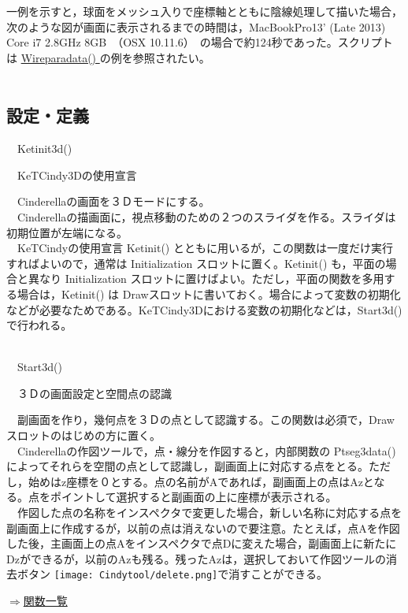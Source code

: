 \documentclass[papersize,a4paper,12pt,uplatex]{jsarticle}
\begin{document}
一例を示すと，球面をメッシュ入りで座標軸とともに陰線処理して描いた場合，次のような図が画面に表示されるまでの時間は，MacBookPro13' (Late 2013) Core i7 2.8GHz 8GB　（OSX 10.11.6）　の場合で約124秒であった。スクリプトは \hyperlink{wireparadata}{Wireparadata() } の例を参照されたい。\\
　　　　　　　　　　　　　

\newpage
\subsection{設定・定義}

\begin{description}

\hypertarget{ketinit3d}{}
\item[関数]　Ketinit3d()
\item[機能]　KeTCindy3Dの使用宣言
\item[説明]　Cinderellaの画面を３Ｄモードにする。\\
　Cinderellaの描画面に，視点移動のための２つのスライダを作る。スライダは初期位置が左端になる。\\
　KeTCindyの使用宣言 Ketinit() とともに用いるが，この関数は一度だけ実行すればよいので，通常は Initialization スロットに置く。Ketinit() も，平面の場合と異なり Initialization スロットに置けばよい。ただし，平面の関数を多用する場合は，Ketinit() は Drawスロットに書いておく。場合によって変数の初期化などが必要なためである。KeTCindy3Dにおける変数の初期化などは，Start3d()で行われる。\\
　\\

\hypertarget{start3d}{}
\item[関数]　Start3d()
\item[機能]　３Ｄの画面設定と空間点の認識
\item[説明]　副画面を作り，幾何点を３Ｄの点として認識する。この関数は必須で，Drawスロットのはじめの方に置く。\\
　Cinderellaの作図ツールで，点・線分を作図すると，内部関数の Ptseg3data() によってそれらを空間の点として認識し，副画面上に対応する点をとる。ただし，始めはz座標を０とする。点の名前がAであれば，副画面上の点はAzとなる。点をポイントして選択すると副画面の上に座標が表示される。\\
　作図した点の名称をインスペクタで変更した場合，新しい名称に対応する点を副画面上に作成するが，以前の点は消えないので要注意。たとえば，点Aを作図した後，主画面上の点Aをインスペクタで点Dに変えた場合，副画面上に新たにDzができるが，以前のAzも残る。残ったAzは，選択しておいて作図ツールの消去ボタン \texttt{[image: Cindytool/delete.png]}で消すことができる。\\
\begin{flushright} \hyperlink{functionlist3d}{$\Rightarrow$関数一覧}\end{flushright}

\end{description}
\newpage
\end{document}
